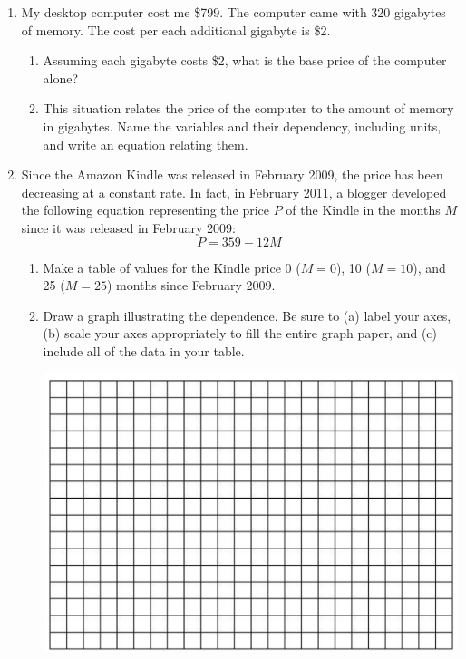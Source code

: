 \documentclass[12pt]{article}
\begin{document}
\begin{enumerate}
\item My desktop computer cost me \$799.  The computer came with 320 gigabytes of memory.  The cost per each additional gigabyte is \$2.  

\begin{enumerate}
\item Assuming each gigabyte costs \$2, what is the base price of the computer alone?
\vfill

\item This situation relates the price of the computer to the amount of memory in gigabytes. Name the variables and their dependency, including units, and write an equation relating them.
\vfill
\vfill
\end{enumerate}

\newpage %
\item Since the Amazon Kindle was released in February 2009, the price has been decreasing at a constant rate.  In fact, in February 2011, a blogger developed the following equation representing the price $P$ of the Kindle in the months $M$ since it was released in February 2009: $$ P = 359 - 12 M $$

\begin{enumerate}
\item Make a table of values for the Kindle price 0 ($M=0$), 10 ($M=10$), and 25 ($M=25$) months since February 2009.
\vfill
\item Draw a graph illustrating the dependence.  Be sure to (a) label your axes, (b) scale your axes appropriately to fill the entire graph paper, and (c) include all of the data in your table.

\begin{center}
 {\includegraphics [width = 6in] {../graphPaper}}
\end{center}
\vspace{.1in}


\end{enumerate}
\end{enumerate}
\end{document}
